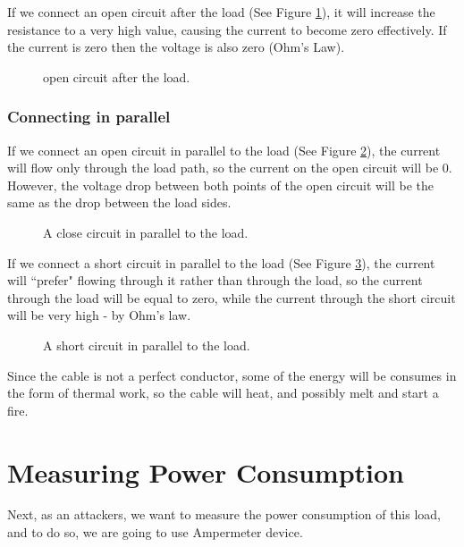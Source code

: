 If we connect an open circuit after the load (See Figure \ref{fig:circuit2}), it will increase the resistance to a very high value, causing the current to become zero effectively. If the current is zero then the voltage is also zero (Ohm's Law).

\begin{figure}[!ht]
    \centering
    
    \caption{open circuit after the load.} \label{fig:circuit2}
\end{figure}

\subsubsection{Connecting in parallel}

If we connect an open circuit in parallel to the load (See Figure \ref{fig:circuit3}), the current will flow only through the load path, so the current on the open circuit will be 0. However, the voltage drop between both points of the open circuit will be the same as the drop between the load sides.

\begin{figure}[!ht]
    \centering
    
    \caption{A close circuit in parallel to the load.} \label{fig:circuit3}
\end{figure}

If we connect a short circuit in parallel to the load (See Figure \ref{fig:circuit4}), the current will ``prefer" flowing through it rather than through the load, so the current through the load will be equal to zero, while the current through the short circuit will be very high - by Ohm's law.

\begin{figure}[!ht]
    \centering
    
    \caption{A short circuit in parallel to the load.} \label{fig:circuit4}
\end{figure}

Since the cable is not a perfect conductor, some of the energy will be consumes in the form of thermal work, so the cable will heat, and possibly melt and start a fire.

\section{Measuring Power Consumption}

Next, as an attackers, we want to measure the power consumption of this load, and to do so, we are going to use Ampermeter device.

